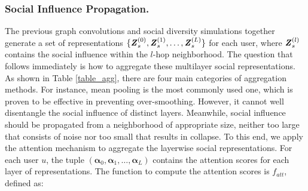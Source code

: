 \documentclass[letterpaper]{article} %
\begin{document}
\subsubsection{Social Influence Propagation.}
The previous graph convolutions and social diversity simulations together generate a set of representations $\{\textbf{\textit{Z}}_s^{(0)}, \textbf{\textit{Z}}_s^{(1)}, \ldots, \textbf{\textit{Z}}_s^{(L)}\}$ for each user, where $\textbf{\textit{Z}}_s^{(l)}$ contains the social influence within the $l$-hop neighborhood. The question that follows immediately is how to aggregate these multilayer social representations. As shown in Table \ref{table_agg}, there are four main categories of aggregation methods. For instance, mean pooling is the most commonly used one, which is proven to be effective in preventing over-smoothing. However, it cannot well disentangle the social influence of distinct layers. Meanwhile, social influence should be propagated from a neighborhood of appropriate size, neither too large that consists of noise nor too small that results in collapse. To this end, we apply the attention mechanism \cite{attention} to aggregate the layerwise social representations. For each user $u$, the tuple $(\boldsymbol{\alpha}_{0},\boldsymbol{\alpha}_{1},\ldots,\boldsymbol{\alpha}_{L})$ contains the attention scores for each layer of representations. The function to compute the attention scores is $f_{att}$, defined as:
\end{document}

